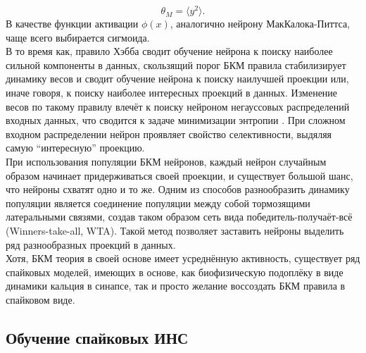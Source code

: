 \documentclass[a4paper,10pt]{article}
\begin{document}
\begin{equation}
\theta_{M} = \langle y^2 \rangle.
\end{equation}
\indent В качестве функции активации $\phi(x)$, аналогично нейрону МакКалока-Питтса, чаще всего выбирается сигмоида.\\ 
\indent В то время как, правило Хэбба сводит обучение нейрона к поиску наиболее сильной компоненты в данных, скользящий порог БКМ правила стабилизирует динамику весов и сводит обучение нейрона к поиску наилучшей проекции или, иначе говоря, к поиску наиболее интересных проекций в данных. Изменение весов по такому правилу влечёт к поиску нейроном негауссовых распределений входных данных, что сводится к задаче минимизации энтропии \cite{bcm_book}. При сложном входном распределении нейрон проявляет свойство селективности, выдяляя самую ``интересную'' проекцию.\\
\indent При использования популяции БКМ нейронов, каждый нейрон случайным образом начинает придерживаться своей проекции, и существует большой шанс, что нейроны схватят одно и то же. Одним из способов разнообразить динамику популяции является соединение популяции между собой тормозящими латеральными связями, создав таком образом сеть вида победитель-получаёт-всё (Winners-take-all, WTA). Такой метод позволяет заставить нейроны выделить ряд разнообразных проекций в данных.\\
\indent Хотя, БКМ теория в своей основе имеет усреднённую активность, существует ряд спайковых моделей, имеющих в основе, как биофизическую подоплёку в виде динамики кальция в синапсе\cite{ShouvalCaBCM}, так и просто желание воссоздать БКМ правила в спайковом виде\cite{PfisterTriple}.
\subsection{Обучение спайковых ИНС}
\end{document}
